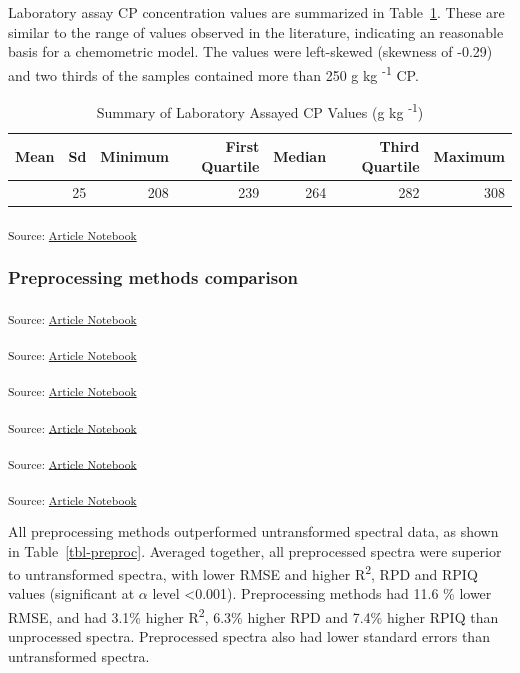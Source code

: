 \documentclass[
]{agujournal2019}
\begin{document}
Laboratory assay CP concentration values are summarized in
Table~\ref{tbl-lab-protein-vals}. These are similar to the range of
values observed in the literature, indicating an reasonable basis for a
chemometric model. The values were left-skewed (skewness of -0.29) and
two thirds of the samples contained more than 250 g kg
\textsuperscript{-1} CP.

\begin{longtable}[]{@{}rrrrrrr@{}}

\caption{\label{tbl-lab-protein-vals}Summary of Laboratory Assayed CP
Values (g kg \textsuperscript{-1})}

\tabularnewline

\toprule\noalign{}
Mean & Sd & Minimum & First Quartile & Median & Third Quartile &
Maximum \\
\midrule\noalign{}
\endhead
\bottomrule\noalign{}
\endlastfoot
261 & 25 & 208 & 239 & 264 & 282 & 308 \\

\end{longtable}

\textsubscript{Source:
\href{https://rvcrawford.github.io/glowing-system/index.qmd.html}{Article
Notebook}}

\subsubsection{Preprocessing methods
comparison}\label{preprocessing-methods-comparison}

\textsubscript{Source:
\href{https://rvcrawford.github.io/glowing-system/index.qmd.html}{Article
Notebook}}

\textsubscript{Source:
\href{https://rvcrawford.github.io/glowing-system/index.qmd.html}{Article
Notebook}}

\textsubscript{Source:
\href{https://rvcrawford.github.io/glowing-system/index.qmd.html}{Article
Notebook}}

\textsubscript{Source:
\href{https://rvcrawford.github.io/glowing-system/index.qmd.html}{Article
Notebook}}

\textsubscript{Source:
\href{https://rvcrawford.github.io/glowing-system/index.qmd.html}{Article
Notebook}}

\textsubscript{Source:
\href{https://rvcrawford.github.io/glowing-system/index.qmd.html}{Article
Notebook}}

All preprocessing methods outperformed untransformed spectral data, as
shown in Table~\ref{tbl-preproc}. Averaged together, all preprocessed
spectra were superior to untransformed spectra, with lower RMSE and
higher R\textsuperscript{2}, RPD and RPIQ values (significant at
\(\alpha\) level \textless0.001). Preprocessing methods had 11.6 \%
lower RMSE, and had 3.1\% higher R\textsuperscript{2}, 6.3\% higher RPD
and 7.4\% higher RPIQ than unprocessed spectra. Preprocessed spectra
also had lower standard errors than untransformed spectra.
\end{document}
